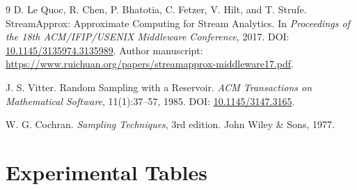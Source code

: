 \documentclass[conference]{IEEEtran}
\begin{document}
\begin{thebibliography}{9}
D. Le Quoc, R. Chen, P. Bhatotia, C. Fetzer, V. Hilt, and T. Strufe.
\newblock StreamApprox: Approximate Computing for Stream Analytics.
\newblock In \emph{Proceedings of the 18th ACM/IFIP/USENIX Middleware Conference}, 2017.
\newblock DOI: \href{https://doi.org/10.1145/3135974.3135989}{10.1145/3135974.3135989}.
\newblock Author manuscript: \url{https://www.ruichuan.org/papers/streamapprox-middleware17.pdf}.

J. S. Vitter.
\newblock Random Sampling with a Reservoir.
\newblock \emph{ACM Transactions on Mathematical Software}, 11(1):37--57, 1985.
\newblock DOI: \href{https://doi.org/10.1145/3147.3165}{10.1145/3147.3165}.

W. G. Cochran.
\newblock \emph{Sampling Techniques}, 3rd edition.
\newblock John Wiley \& Sons, 1977.
\end{thebibliography}

\appendices

\section{Experimental Tables}
\label{sec:appendix_tables}
\end{document}
